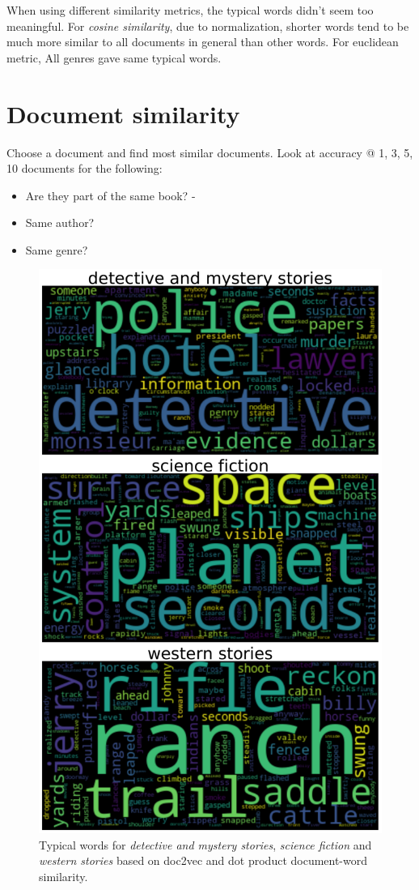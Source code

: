 When using different similarity metrics, the typical words didn't seem too meaningful. For \textit{cosine similarity}, due to normalization, shorter words tend to be much more similar to all documents in general than other words. For euclidean metric, All genres gave same typical words.


\section{Document similarity}
Choose a document and find most similar documents. Look at accuracy @ 1, 3, 5, 10 documents for the following:
\begin{itemize}
	\item Are they part of the same book? - 
	\item Same author?
	\item Same genre?
\end{itemize}


\begin{figure}[h]
	\centering
	\includegraphics[height=0.6\textheight]{img/06_typical_words_genre}
	\caption{Typical words for \textit{detective and mystery stories}, \textit{science fiction} and \textit{western stories} based on doc2vec and dot product document-word similarity.}
	\label{fig:typical_words_genre}
\end{figure}

